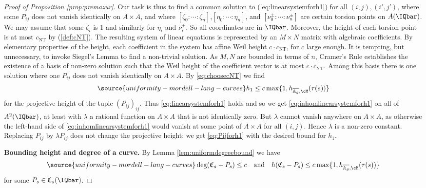 \begin{proof}[Proof of Proposition \ref{prop:premazur}]
  Our task is thus to find a  common solution to
  (\ref{eq:linearsystemforh1}) for all $(i,j),(i',j')$, where some
  $P_{ij}$ does not vanish identically on $A\times A$, and where
  $[\zeta_0:\cdots:\zeta_n]$,$[\eta_0:\cdots:\eta_n]$, and
  $[\nu^{\pm}_0:\cdots :\nu^{\pm}_n]$ are certain torsion points on
  $A(\IQbar)$. We may assume that some $\zeta_i$ is $1$ and similarly
  for  $\eta_i$ and
  $\nu^{\pm}_i$. So all coordinates are in $\IQbar$. Moreover, the
  height  of each torsion point is at most $c_{\mathrm{NT}}$ by (\ref{def:cNT}).
  The resulting system of linear equations is represented by an
  $M\times N$ matrix with algebraic coefficients. By elementary
  properties of the height, each coefficient in the system has affine
  Weil height $c \cdot c_{\mathrm{NT}}$, for $c$ large enough. It is tempting, but
  unnecessary, to invoke Siegel's Lemma to find a non-trivial solution.
  As $M,N$ are bounded in terms of $n$,
  Cramer's Rule establishes the existence of a basis of
  non-zero solution such that the Weil height of the coefficient
  vector is at most $c \cdot c_{\mathrm{NT}}$.
  Among this basis there
  is one solution where one $P_{ij}$ does not vanish identically on
  $A\times A$. By \eqref{eq:choosecNT} we find
  \begin{equation}
    \label{eq:h1bound}
\source{uniformity-mordell-lang-curves}
    h_1 \le     c\max\{1,h_{\overline{\mathbb{A}_g},\cM}(\tau(s))\}
  \end{equation}
  for the projective height of the tuple $(P_{ij})_{ij}$.
  Thus \eqref{eq:linearsystemforh1} holds and so we get
  \eqref{eq:inhomlinearsystemforh1} on all of $A^2(\IQbar)$, at least with  $\lambda$ a rational
  function on $A\times A$ that is not identically zero. But $\lambda$ cannot
  vanish anywhere on $A\times A$, as otherwise the left-hand side of
  \eqref{eq:inhomlinearsystemforh1} would vanish at some point of
  $A\times A$ for all $(i,j)$. Hence $\lambda$ is a non-zero constant. Replacing
  $P_{ij}$ by $\lambda P_{ij}$ does not change the projective height;
  we get \eqref{eq:Pijforh1} with the desired bound for $h_1$.


  \textbf{Bounding height and degree of a curve.}
  By Lemma \ref{lem:uniformdegreebound} we have
  \begin{equation}
    \label{eq:degreehgtbound}
\source{uniformity-mordell-lang-curves}
    \deg(\mathfrak{C}_s-P_s)\le c\quad\text{and}\quad
    h(\mathfrak{C}_s-P_s)\le
    c \max\{1,h_{\overline{\mathbb{A}_g},\cM}(\tau(s))\}
  \end{equation}
  for some
  $P_s\in \mathfrak{C}_s(\IQbar)$.




\end{proof}
